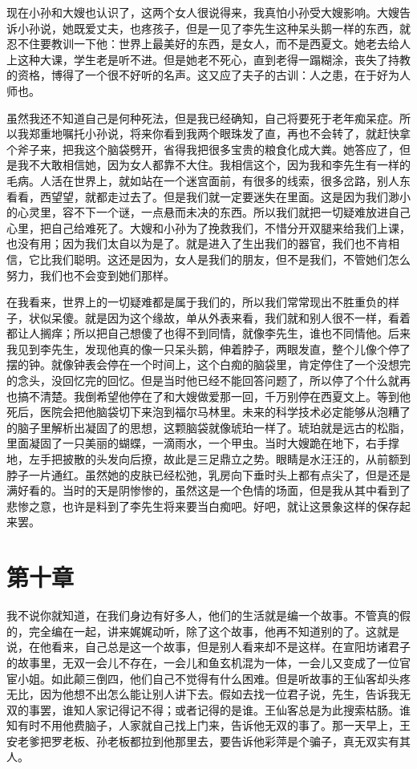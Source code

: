 现在小孙和大嫂也认识了，这两个女人很说得来，我真怕小孙受大嫂影响。大嫂告诉小孙说，她既爱丈夫，也疼孩子，但是一见了李先生这种呆头鹅一样的东西，就忍不住要教训一下他：世界上最美好的东西，是女人，而不是西夏文。她老去给人上这种大课，学生老是听不进。但是她老不死心，直到老得一蹋糊涂，丧失了持教的资格，博得了一个很不好听的名声。这又应了夫子的古训：人之患，在于好为人师也。 

虽然我还不知道自己是何种死法，但是我已经确知，自己将要死于老年痴呆症。所以我郑重地嘱托小孙说，将来你看到我两个眼珠发了直，再也不会转了，就赶快拿个斧子来，把我这个脑袋劈开，省得我把很多宝贵的粮食化成大粪。她答应了，但是我不大敢相信她，因为女人都靠不大住。我相信这个，因为我和李先生有一样的毛病。人活在世界上，就如站在一个迷宫面前，有很多的线索，很多岔路，别人东看看，西望望，就都走过去了。但是我们就一定要迷失在里面。这是因为我们渺小的心灵里，容不下一个谜，一点悬而未决的东西。所以我们就把一切疑难放进自己心里，把自己给难死了。大嫂和小孙为了挽救我们，不惜分开双腿来给我们上课，也没有用；因为我们太自以为是了。就是进入了生出我们的器官，我们也不肯相信，它比我们聪明。这还是因为，女人是我们的朋友，但不是我们，不管她们怎么努力，我们也不会变到她们那样。 

在我看来，世界上的一切疑难都是属于我们的，所以我们常常现出不胜重负的样子，状似呆傻。就是因为这个缘故，单从外表来看，我们就和别人很不一样，看着都让人搁痒；所以把自己想傻了也得不到同情，就像李先生，谁也不同情他。后来我见到李先生，发现他真的像一只呆头鹅，伸着脖子，两眼发直，整个儿像个停了摆的钟。就像钟表会停在一个时间上，这个白痴的脑袋里，肯定停住了一个没想完的念头，没回忆完的回忆。但是当时他已经不能回答问题了，所以停了个什么就再也搞不清楚。我倒希望他停在了和大嫂做爱那一回，千万别停在西夏文上。等到他死后，医院会把他脑袋切下来泡到福尔马林里。未来的科学技术必定能够从泡糟了的脑子里解析出凝固了的思想，这颗脑袋就像琥珀一样了。琥珀就是远古的松脂，里面凝固了一只美丽的蝴蝶，一滴雨水，一个甲虫。当时大嫂跪在地下，右手撑地，左手把披散的头发向后撩，故此是三足鼎立之势。眼睛是水汪汪的，从前额到脖子一片通红。虽然她的皮肤已经松弛，乳房向下垂时头上都有点尖了，但是还是满好看的。当时的天是阴惨惨的，虽然这是一个色情的场面，但是我从其中看到了悲惨之意，也许是料到了李先生将来要当白痴吧。好吧，就让这景象这样的保存起来罢。

\section{第十章}

我不说你就知道，在我们身边有好多人，他们的生活就是编一个故事。不管真的假的，完全编在一起，讲来娓娓动听，除了这个故事，他再不知道别的了。这就是说，在他看来，自己总是这一个故事，但是别人看来却不是这样。在宣阳坊诸君子的故事里，无双一会儿不存在，一会儿和鱼玄机混为一体，一会儿又变成了一位官宦小姐。如此颠三倒四，他们自己不觉得有什么困难。但是听故事的王仙客却头疼无比，因为他想不出怎么能让别人讲下去。假如去找一位君子说，先生，告诉我无双的事罢，谁知人家记得记不得；或者记得的是谁。王仙客总是为此搜索枯肠。谁知有时不用他费脑子，人家就自己找上门来，告诉他无双的事了。那一天早上，王安老爹把罗老板、孙老板都拉到他那里去，要告诉他彩萍是个骗子，真无双实有其人。 

